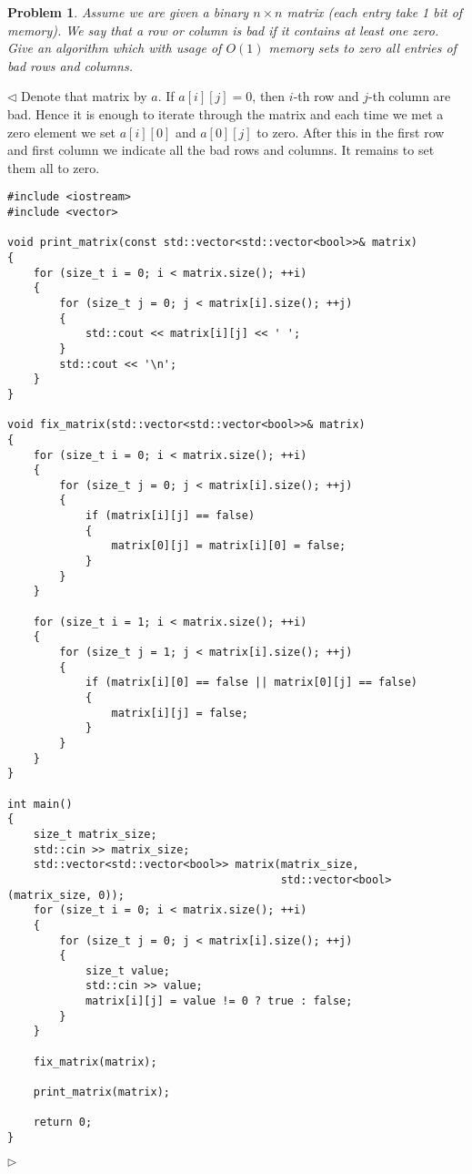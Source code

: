 \documentclass[12pt]{article}
\newtheorem{problem}{Problem}[subsection]
\newenvironment{solution}{\par $\triangleleft$}{$\triangleright$}
\begin{document}
\begin{problem} Assume we are given a binary $n\times n$ matrix (each entry take 1 bit of memory). We say that a row or column is bad if it contains at least one zero. Give an algorithm which with usage of $O(1)$ memory sets to zero all entries of bad rows and columns.
\end{problem}
\begin{solution} Denote that matrix by $a$. If $a[i][j]=0$, then $i$-th row and $j$-th column are bad. Hence it is enough to iterate through the matrix and each time we met a zero element we set $a[i][0]$ and $a[0][j]$ to zero. After this in the first row and first column we indicate all the bad rows and columns. It remains to set them all to zero. 
\begin{verbatim}
#include <iostream>
#include <vector>
 
void print_matrix(const std::vector<std::vector<bool>>& matrix)
{
    for (size_t i = 0; i < matrix.size(); ++i)
    {
        for (size_t j = 0; j < matrix[i].size(); ++j)
        {
            std::cout << matrix[i][j] << ' ';
        }
        std::cout << '\n';
    }
}
 
void fix_matrix(std::vector<std::vector<bool>>& matrix)
{
    for (size_t i = 0; i < matrix.size(); ++i)
    {
        for (size_t j = 0; j < matrix[i].size(); ++j)
        {
            if (matrix[i][j] == false)
            {
                matrix[0][j] = matrix[i][0] = false;
            }
        }
    }
 
    for (size_t i = 1; i < matrix.size(); ++i)
    {
        for (size_t j = 1; j < matrix[i].size(); ++j)
        {
            if (matrix[i][0] == false || matrix[0][j] == false)
            {
                matrix[i][j] = false;
            }
        } 
    }
}
 
int main()
{
    size_t matrix_size;
    std::cin >> matrix_size;
    std::vector<std::vector<bool>> matrix(matrix_size, 
                                          std::vector<bool>(matrix_size, 0));
    for (size_t i = 0; i < matrix.size(); ++i)
    {
        for (size_t j = 0; j < matrix[i].size(); ++j)
        {
            size_t value;
            std::cin >> value;
            matrix[i][j] = value != 0 ? true : false;
        }
    }
 
    fix_matrix(matrix);
 
    print_matrix(matrix);
 
    return 0;
}
\end{verbatim}
\end{solution}
 
\end{document}
